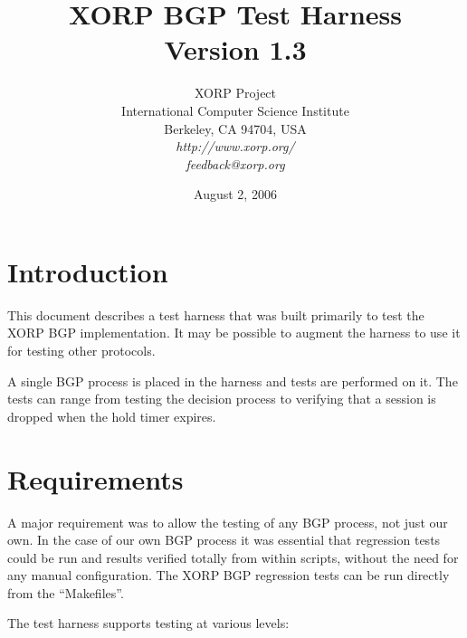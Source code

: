 \documentclass[11pt]{article}
\begin{document}
\title{XORP BGP Test Harness \\
\vspace{1ex}
Version 1.3}
\author{ XORP Project					\\
	 International Computer Science Institute	\\
	 Berkeley, CA 94704, USA			\\
         {\it http://www.xorp.org/}			\\
	 {\it feedback@xorp.org}
}
\date{August 2, 2006}

\maketitle


%
%
\newcommand{\coordinator}{{\em coordinator}\xspace}
\newcommand{\testpeer}{{\em test peer}\xspace}
\newcommand{\testpeers}{{\em test peers}\xspace}

\section{Introduction}

This document describes a test harness that was built primarily to
test the XORP BGP implementation. It may be possible to augment the
harness to use it for testing other protocols.

A single BGP process is placed in the harness and tests
are performed on it. The tests can range from testing the decision
process to verifying that a session is dropped when the hold timer expires.

\section{Requirements}

A major requirement was to allow the testing of any BGP process, not
just our own. In the case of our own BGP process it was essential that
regression tests could be run and results verified totally from within
scripts, without the need for any manual configuration. The
XORP BGP regression tests can be run directly from the ``Makefiles''.
\newline

The test harness supports testing at various levels:
\end{document}
